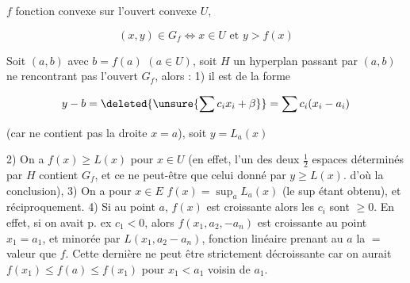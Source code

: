 
$f$ fonction convexe sur l'ouvert convexe $U$,

\[
(x,y)\in G_f\iff x\in U\text{ et } y>f(x)
\]

Soit  $(a,b)$ avec $b=f(a)$ $(a\in U)$,  soit $H$ un hyperplan passant par $(a,b)$ ne rencontrant pas l'ouvert $G_f$, alors : 1) il est de la forme

\[
y-b=\deleted{\unsure{\sum c_i x_i+\beta}}=\sum c_i(x_i-a_i)
\]

(car ne contient pas la droite $x=a$), soit $y=L_a(x)$

2) On a $f(x)\geq L(x)$ pour \uline{} $x\in U$ (en effet, l'un des deux  $\frac12$ espaces  déterminés par $H$ contient $G_f$, et ce ne peut-être que celui donné par $y\geq L(x)$.  d'où la conclusion), 3) On a pour $x\in E$ $f(x)=\sup_a L_a(x)$ (le sup étant obtenu), et réciproquement. 4) Si au point $a$, $f(x)$ est croissante alors les $c_i$ sont $\geq0$. En effet, si on avait p. ex $c_1<0$, alors $f(x_1,a_2,-a_n)$ est croissante au point $x_1=a_1$,
\reversemarginpar{}\normalmarginpar
et  minorée par $L(x_1,a_2-a_n)$, fonction linéaire prenant au  $a$ la $=$ valeur que $f$. Cette dernière ne peut être strictement décroissante car on aurait $f(x_1)\leq f(a)\leq f(x_1)$ pour $x_1<a_1$ voisin de $a_1$.

\reversemarginpar{}\normalmarginpar
